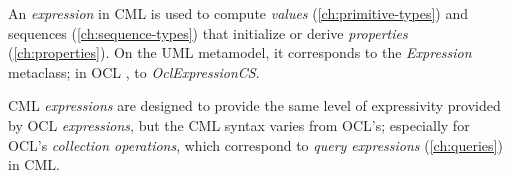 An \emph{expression} in CML is used to compute
\emph{values} (\ref{ch:primitive-types}) and sequences (\ref{ch:sequence-types})
that initialize or derive \emph{properties} (\ref{ch:properties}).
On the UML \cite{uml} metamodel,
it corresponds to the \emph{Expression} metaclass;
in OCL \cite{ocl}, to \emph{OclExpressionCS}.

CML \emph{expressions} are designed to provide the same level of
expressivity provided by OCL \emph{expressions},
but the CML syntax varies from OCL's;
especially for OCL's \emph{collection operations},
which correspond to \emph{query expressions} (\ref{ch:queries}) in CML.

